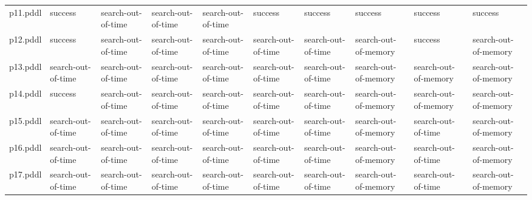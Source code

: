 \documentclass{article}
\begin{document}
\begin{tabular}{@{}lrrrrrrrrr@{}}
p11.pddl & \multicolumn{1}{|l|}{success} & \multicolumn{1}{|l|}{search-out-of-time} & \multicolumn{1}{|l|}{search-out-of-time} & \multicolumn{1}{|l|}{search-out-of-time} & \multicolumn{1}{|l|}{success} & \multicolumn{1}{|l|}{success} & \multicolumn{1}{|l|}{success} & \multicolumn{1}{|l|}{success} & \multicolumn{1}{|l|}{success} \\
p12.pddl & \multicolumn{1}{|l|}{success} & \multicolumn{1}{|l|}{search-out-of-time} & \multicolumn{1}{|l|}{search-out-of-time} & \multicolumn{1}{|l|}{search-out-of-time} & \multicolumn{1}{|l|}{search-out-of-time} & \multicolumn{1}{|l|}{search-out-of-time} & \multicolumn{1}{|l|}{search-out-of-memory} & \multicolumn{1}{|l|}{success} & \multicolumn{1}{|l|}{search-out-of-memory} \\
p13.pddl & \multicolumn{1}{|l|}{search-out-of-time} & \multicolumn{1}{|l|}{search-out-of-time} & \multicolumn{1}{|l|}{search-out-of-time} & \multicolumn{1}{|l|}{search-out-of-time} & \multicolumn{1}{|l|}{search-out-of-time} & \multicolumn{1}{|l|}{search-out-of-time} & \multicolumn{1}{|l|}{search-out-of-memory} & \multicolumn{1}{|l|}{search-out-of-memory} & \multicolumn{1}{|l|}{search-out-of-memory} \\
p14.pddl & \multicolumn{1}{|l|}{success} & \multicolumn{1}{|l|}{search-out-of-time} & \multicolumn{1}{|l|}{search-out-of-time} & \multicolumn{1}{|l|}{search-out-of-time} & \multicolumn{1}{|l|}{search-out-of-time} & \multicolumn{1}{|l|}{search-out-of-time} & \multicolumn{1}{|l|}{search-out-of-memory} & \multicolumn{1}{|l|}{search-out-of-memory} & \multicolumn{1}{|l|}{search-out-of-memory} \\
p15.pddl & \multicolumn{1}{|l|}{search-out-of-time} & \multicolumn{1}{|l|}{search-out-of-time} & \multicolumn{1}{|l|}{search-out-of-time} & \multicolumn{1}{|l|}{search-out-of-time} & \multicolumn{1}{|l|}{search-out-of-time} & \multicolumn{1}{|l|}{search-out-of-time} & \multicolumn{1}{|l|}{search-out-of-memory} & \multicolumn{1}{|l|}{search-out-of-time} & \multicolumn{1}{|l|}{search-out-of-memory} \\
p16.pddl & \multicolumn{1}{|l|}{search-out-of-time} & \multicolumn{1}{|l|}{search-out-of-time} & \multicolumn{1}{|l|}{search-out-of-time} & \multicolumn{1}{|l|}{search-out-of-time} & \multicolumn{1}{|l|}{search-out-of-time} & \multicolumn{1}{|l|}{search-out-of-time} & \multicolumn{1}{|l|}{search-out-of-memory} & \multicolumn{1}{|l|}{search-out-of-time} & \multicolumn{1}{|l|}{search-out-of-memory} \\
p17.pddl & \multicolumn{1}{|l|}{search-out-of-time} & \multicolumn{1}{|l|}{search-out-of-time} & \multicolumn{1}{|l|}{search-out-of-time} & \multicolumn{1}{|l|}{search-out-of-time} & \multicolumn{1}{|l|}{search-out-of-time} & \multicolumn{1}{|l|}{search-out-of-time} & \multicolumn{1}{|l|}{search-out-of-memory} & \multicolumn{1}{|l|}{search-out-of-time} & \multicolumn{1}{|l|}{search-out-of-memory} \\

\end{tabular}
\end{document}
